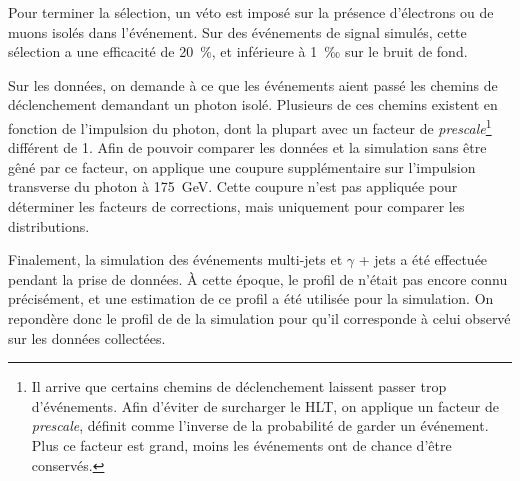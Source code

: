 Pour terminer la sélection, un véto est imposé sur la présence d'électrons ou de muons isolés dans l'événement. Sur des événements de signal simulés, cette sélection a une efficacité de \tilde \SI{20}{\%}, et inférieure à \tilde\SI{1}{‰} sur le bruit de fond.

\bigskip

Sur les données, on demande à ce que les événements aient passé les chemins de déclenchement demandant un photon isolé. Plusieurs de ces chemins existent en fonction de l'impulsion du photon, dont la plupart avec un facteur de \emph{prescale}\footnote{Il arrive que certains chemins de déclenchement laissent passer trop d'événements. Afin d'éviter de surcharger le HLT, on applique un facteur de \emph{prescale}, définit comme l'inverse de la probabilité de garder un événement. Plus ce facteur est grand, moins les événements ont de chance d'être conservés.} différent de 1. Afin de pouvoir comparer les données et la simulation sans être gêné par ce facteur, on applique une coupure supplémentaire sur l'impulsion transverse du photon à \SI{175}{\GeV}. Cette coupure n'est pas appliquée pour déterminer les facteurs de corrections, mais uniquement pour comparer les distributions.

\smallskip

Finalement, la simulation des événements multi-jets et $\gamma$ + jets a été effectuée pendant la prise de données. À cette époque, le profil de \pu n'était pas encore connu précisément, et une estimation de ce profil a été utilisée pour la simulation. On repondère donc le profil de \pu de la simulation pour qu'il corresponde à celui observé sur les données collectées.

